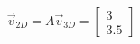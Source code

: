 \documentclass[preview]{standalone}
\begin{document}
\begin{align*}
\vec{v}_{2D} = A \vec{v}_{3D} = \begin{bmatrix} 3 \\ 3.5 \end{bmatrix}
\end{align*}
\end{document}
